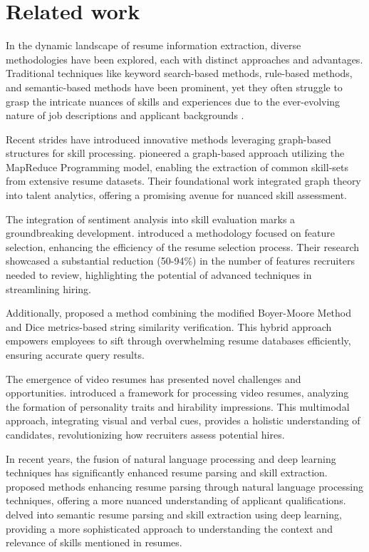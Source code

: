 \section{Related work}
In the dynamic landscape of resume information extraction, diverse methodologies have been explored, each with distinct approaches and advantages. Traditional techniques like keyword search-based methods, rule-based methods, and semantic-based methods have been prominent, yet they often struggle to grasp the intricate nuances of skills and experiences due to the ever-evolving nature of job descriptions and applicant backgrounds \cite{chen2018two}.

Recent strides have introduced innovative methods leveraging graph-based structures for skill processing.\cite{velampalli2016novel} pioneered a graph-based approach utilizing the MapReduce Programming model, enabling the extraction of common skill-sets from extensive resume datasets. Their foundational work integrated graph theory into talent analytics, offering a promising avenue for nuanced skill assessment.

The integration of sentiment analysis into skill evaluation marks a groundbreaking development. \cite{maheshwari2010approach}
introduced a methodology focused on feature selection, enhancing the efficiency of the resume selection process. Their research showcased a substantial reduction (50-94\%) in the number of features recruiters needed to review, highlighting the potential of advanced techniques in streamlining hiring.

 Additionally, \cite{nasr2019assessment} proposed a method combining the modified Boyer-Moore Method and Dice metrics-based string similarity verification. This hybrid approach empowers employees to sift through overwhelming resume databases efficiently, ensuring accurate query results.

The emergence of video resumes has presented novel challenges and opportunities. \cite{chen2018two} introduced a framework for processing video resumes, analyzing the formation of personality traits and hirability impressions. This multimodal approach, integrating visual and verbal cues, provides a holistic understanding of candidates, revolutionizing how recruiters assess potential hires.

In recent years, the fusion of natural language processing and deep learning techniques has significantly enhanced resume parsing and skill extraction. \cite{johnston2001information} proposed methods enhancing resume parsing through natural language processing techniques, offering a more nuanced understanding of applicant qualifications. \cite{jones2021deep} delved into semantic resume parsing and skill extraction using deep learning, providing a more sophisticated approach to understanding the context and relevance of skills mentioned in resumes.

